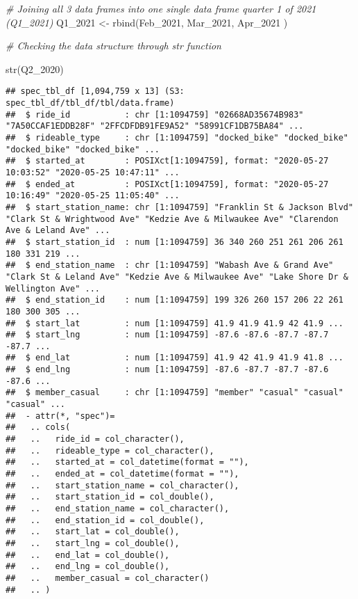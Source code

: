 \documentclass[
]{article}
\newenvironment{Shaded}{\begin{snugshade}}{\end{snugshade}}
\newcommand{\CommentTok}[1]{\textcolor[rgb]{0.56,0.35,0.01}{\textit{#1}}}
\newcommand{\FunctionTok}[1]{\textcolor[rgb]{0.00,0.00,0.00}{#1}}
\newcommand{\NormalTok}[1]{#1}
\newcommand{\OtherTok}[1]{\textcolor[rgb]{0.56,0.35,0.01}{#1}}
\begin{document}
\begin{Shaded}
\begin{Highlighting}[]
\CommentTok{\# Joining all 3 data frames into one single data frame quarter 1 of 2021 (Q1\_2021)}
\NormalTok{  Q1\_2021 }\OtherTok{\textless{}{-}} \FunctionTok{rbind}\NormalTok{(Feb\_2021, Mar\_2021, Apr\_2021 )}
  
\CommentTok{\# Checking the data structure through str function}
  
  \FunctionTok{str}\NormalTok{(Q2\_2020)}
\end{Highlighting}
\end{Shaded}

\begin{verbatim}
## spec_tbl_df [1,094,759 x 13] (S3: spec_tbl_df/tbl_df/tbl/data.frame)
##  $ ride_id           : chr [1:1094759] "02668AD35674B983" "7A50CCAF1EDDB28F" "2FFCDFDB91FE9A52" "58991CF1DB75BA84" ...
##  $ rideable_type     : chr [1:1094759] "docked_bike" "docked_bike" "docked_bike" "docked_bike" ...
##  $ started_at        : POSIXct[1:1094759], format: "2020-05-27 10:03:52" "2020-05-25 10:47:11" ...
##  $ ended_at          : POSIXct[1:1094759], format: "2020-05-27 10:16:49" "2020-05-25 11:05:40" ...
##  $ start_station_name: chr [1:1094759] "Franklin St & Jackson Blvd" "Clark St & Wrightwood Ave" "Kedzie Ave & Milwaukee Ave" "Clarendon Ave & Leland Ave" ...
##  $ start_station_id  : num [1:1094759] 36 340 260 251 261 206 261 180 331 219 ...
##  $ end_station_name  : chr [1:1094759] "Wabash Ave & Grand Ave" "Clark St & Leland Ave" "Kedzie Ave & Milwaukee Ave" "Lake Shore Dr & Wellington Ave" ...
##  $ end_station_id    : num [1:1094759] 199 326 260 157 206 22 261 180 300 305 ...
##  $ start_lat         : num [1:1094759] 41.9 41.9 41.9 42 41.9 ...
##  $ start_lng         : num [1:1094759] -87.6 -87.6 -87.7 -87.7 -87.7 ...
##  $ end_lat           : num [1:1094759] 41.9 42 41.9 41.9 41.8 ...
##  $ end_lng           : num [1:1094759] -87.6 -87.7 -87.7 -87.6 -87.6 ...
##  $ member_casual     : chr [1:1094759] "member" "casual" "casual" "casual" ...
##  - attr(*, "spec")=
##   .. cols(
##   ..   ride_id = col_character(),
##   ..   rideable_type = col_character(),
##   ..   started_at = col_datetime(format = ""),
##   ..   ended_at = col_datetime(format = ""),
##   ..   start_station_name = col_character(),
##   ..   start_station_id = col_double(),
##   ..   end_station_name = col_character(),
##   ..   end_station_id = col_double(),
##   ..   start_lat = col_double(),
##   ..   start_lng = col_double(),
##   ..   end_lat = col_double(),
##   ..   end_lng = col_double(),
##   ..   member_casual = col_character()
##   .. )
\end{verbatim}
\end{document}
